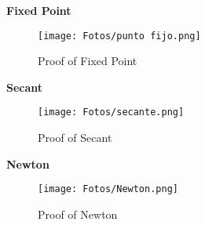 \documentclass[letterpaper,12pt]{article}
\begin{document}
\textbf{Fixed Point}

\begin{figure}[H]
  \texttt{[image: Fotos/punto fijo.png]}
  \caption{Proof of Fixed Point}
  \label{fig:cond}
\end{figure}
\textbf{\textbf{\textbf{}}}

\textbf{Secant}

\begin{figure}[H]
  \texttt{[image: Fotos/secante.png]}
  \caption{Proof of Secant}
  \label{fig:cond}
\end{figure}
\textbf{\textbf{\textbf{}}}


\textbf{Newton}

\begin{figure}[H]
  \texttt{[image: Fotos/Newton.png]}
  \caption{Proof of Newton}
  \label{fig:cond}
\end{figure}
\textbf{\textbf{\textbf{}}}
\end{document}
